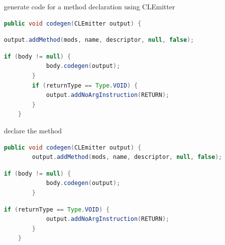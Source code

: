 \documentclass[8pt,a4paper,compress]{beamer}
\begin{document}
\begin{frame}[fragile]
\begin{overprint}
\begin{tcolorbox}[enhanced,drop shadow southwest,sharp corners,size=fbox,colback=white,fontlower=\small\ttfamily,collower=silver900]
\tcblower
\begin{minipage}[t][.25cm][t]{\textwidth}
generate code for a method declaration using CLEmitter
\end{minipage}
\end{tcolorbox}

\begin{tcolorbox}[enhanced,drop shadow southwest,sharp corners,size=fbox,colback=white,fontlower=\small\ttfamily,collower=silver900]

\begin{lstlisting}[language=Java,style=focusout]
    public void codegen(CLEmitter output) {
\end{lstlisting}
\begin{lstlisting}[language=Java,style=focusin,backgroundcolor=\color{lime100}]
        output.addMethod(mods, name, descriptor, null, false);
\end{lstlisting}
\begin{lstlisting}[language=Java,style=focusout]
        if (body != null) {
            body.codegen(output);
        }
        if (returnType == Type.VOID) {
            output.addNoArgInstruction(RETURN);
        }
    }
\end{lstlisting}

\tcblower
\begin{minipage}[t][.25cm][t]{\textwidth}
declare the method
\end{minipage}
\end{tcolorbox}

\begin{tcolorbox}[enhanced,drop shadow southwest,sharp corners,size=fbox,colback=white,fontlower=\small\ttfamily,collower=silver900]

\begin{lstlisting}[language=Java,style=focusout]
    public void codegen(CLEmitter output) {
        output.addMethod(mods, name, descriptor, null, false);
\end{lstlisting}
\begin{lstlisting}[language=Java,style=focusin,backgroundcolor=\color{lime100}]
        if (body != null) {
            body.codegen(output);
        }
\end{lstlisting}
\begin{lstlisting}[language=Java,style=focusout]
        if (returnType == Type.VOID) {
            output.addNoArgInstruction(RETURN);
        }
    }
\end{lstlisting}


\end{tcolorbox}
\end{overprint}
\end{frame}
\end{document}
